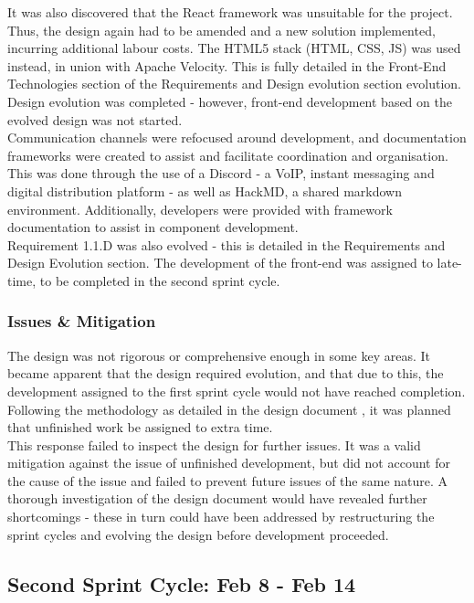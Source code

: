 \documentclass[9pt, titlepage]{extarticle}
\begin{document}
It was also discovered that the React framework \cite{web:react} was unsuitable for the project. Thus, the design again had to be amended and a new solution implemented, incurring additional labour costs. The HTML5 stack (HTML, CSS, JS) was used instead, in union with Apache Velocity. This is fully detailed in the Front-End Technologies section of the Requirements and Design evolution section evolution. Design evolution was completed - however, front-end development based on the evolved design was not started.\\

Communication channels were refocused around development, and documentation frameworks were created to assist and facilitate coordination and organisation. This was done through the use of a Discord \cite{discord} - a VoIP, instant messaging and digital distribution platform - as well as HackMD, \cite{hackmd} a shared markdown environment. Additionally, developers were provided with framework documentation to assist in component development.\\

Requirement 1.1.D was also evolved - this is detailed in the Requirements and Design Evolution section. The development of the front-end was assigned to late-time, to be completed in the second sprint cycle.

\subsubsection{Issues \& Mitigation}

The design was not rigorous or comprehensive enough in some key areas. It became apparent that the design required evolution, and that due to this, the development assigned to the first sprint cycle would not have reached completion. Following the methodology as detailed in the design document \cite{design-and-planning}, it was planned that unfinished work be assigned to extra time.\\

This response failed to inspect the design for further issues. It was a valid mitigation against the issue of unfinished development, but did not account for the cause of the issue and failed to prevent future issues of the same nature. A thorough investigation of the design document would have revealed further shortcomings - these in turn could have been addressed by restructuring the sprint cycles and evolving the design before development proceeded.

\subsection{Second Sprint Cycle: Feb 8 - Feb 14}
\end{document}
